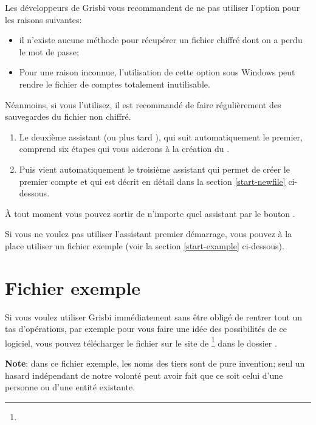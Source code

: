Les développeurs de Grisbi vous recommandent de ne pas utiliser l'option  pour les raisons suivantes: 
	\begin{itemize}
		\item il n’existe aucune méthode pour récupérer un fichier chiffré dont on a perdu le mot de passe;
		\item Pour une raison inconnue, l’utilisation de cette option sous Windows peut rendre le fichier de comptes totalement inutilisable.
	\end{itemize}  
Néanmoins, si vous l'utilisez, il est recommandé de faire régulièrement des sauvegardes du fichier non chiffré.

\begin{enumerate}[resume]
	\item Le deuxième assistant  (ou plus tard ), qui suit automatiquement le premier, comprend six étapes qui vous aiderons à la création du . 
	\item Puis vient automatiquement le troisième assistant  qui permet de créer le premier compte et qui est décrit en détail dans la section \ref{start-newfile} ci-dessous.
\end{enumerate}
À tout moment vous pouvez sortir de n'importe quel assistant par le bouton .

Si vous ne voulez pas utiliser l'assistant premier démarrage, vous pouvez à la
place utiliser un fichier exemple (voir la section \ref{start-example} ci-dessous).


\section{Fichier exemple\label{start-example}}


Si vous voulez utiliser Grisbi immédiatement sans être obligé de rentrer tout un tas d'opérations, par exemple pour vous faire une idée des possibilités de ce logiciel, vous pouvez télécharger le fichier  sur le site de \footnote{\urlSourceForgeDocumentation{}} dans le dossier .

\textbf{Note}: dans ce fichier exemple, les noms des tiers sont de pure invention; seul un hasard indépendant de notre volonté peut avoir fait que ce soit celui d'une personne ou d'une entité existante.


